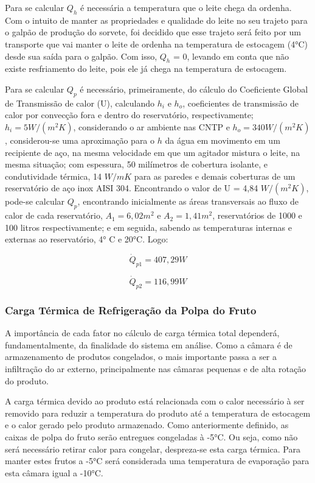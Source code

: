 \documentclass[10pt,a4paper]{article}
\begin{document}
Para se calcular $Q_h$ é necessária a temperatura que o leite chega da ordenha. Com o intuito de manter as propriedades e qualidade do leite no seu trajeto para o galpão de produção do sorvete, foi decidido que esse trajeto será feito por um transporte que vai manter o leite de ordenha na temperatura de estocagem (4°C) desde sua saída para o galpão. Com isso, $Q_h$ = 0, levando em conta que não existe resfriamento do leite, pois ele já chega na temperatura de estocagem.

Para se calcular $Q_p$ é necessário, primeiramente, do cálculo do Coeficiente Global de Transmissão de calor (U), calculando $h_i$ e $h_o$, coeficientes de transmissão de calor por convecção fora e dentro do reservatório, respectivamente; $h_i = 5 W/(m^2 K)$, considerando o ar ambiente nas CNTP e $h_o = 340 W/(m^2 K)$, considerou-se uma aproximação para o $h$ da água em movimento em um recipiente de aço, na mesma velocidade em que um agitador mistura o leite, na mesma situação; com espessura, 50 milímetros de cobertura isolante, e condutividade térmica, 14 $W/mK$ para as paredes e demais coberturas de um reservatório de aço inox AISI 304.
Encontrando o  valor de U = 4,84 $W/(m^2 K)$, pode-se calcular $Q_p$, encontrando inicialmente as áreas transversais ao fluxo de calor de cada reservatório, $A_1=6,02 m^2$ e $A_2=1,41 m^2$, reservatórios de 1000 e 100 litros respectivamente; e em seguida, sabendo as temperaturas internas e externas ao reservatório, 4° C e 20°C. Logo:

\begin{equation}
    \dot{Q}_{p1} = 407,29 W
\end{equation}

\begin{equation}
    \dot{Q}_{p2} = 116,99 W
\end{equation}


\subsubsection{{ Carga Térmica de Refrigeração da Polpa do Fruto}}

A importância de cada fator no cálculo de carga térmica total dependerá, fundamentalmente, da finalidade do sistema em análise. Como a câmara é de armazenamento de produtos congelados, o mais importante passa a ser a infiltração do ar externo, principalmente nas câmaras pequenas e de alta rotação do produto.

A carga térmica devido ao produto está relacionada com o calor necessário à ser removido para reduzir a temperatura do produto até a temperatura de estocagem e o calor gerado pelo produto armazenado. Como anteriormente definido, as caixas de polpa do fruto serão entregues congeladas à -5°C. Ou seja, como não será necessário retirar calor para congelar, despreza-se esta carga térmica. Para manter estes frutos a -5°C será considerada uma temperatura de evaporação para esta câmara igual a -10°C.
\end{document}
